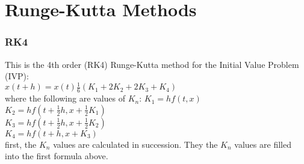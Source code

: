 \section{Runge-Kutta Methods}
\subsubsection*{RK4}
This is the 4th order (RK4) Runge-Kutta
method for the Initial Value Problem (IVP):\\
$x(t+h) = x(t) \frac{1}{6}( K_1  + 2K_2 + 2K_3 + K_4) $\\
where the following are values of $K_n$:
$ K_1 = h f(t,x)    $\\
$ K_2 = h f(t + \frac{1}{2} h , x + \frac{1}{2} K_1)    $\\
$ K_3 = h f(t + \frac{1}{2} h , x + \frac{1}{2} K_2)    $\\
$ K_4 = h f(t + h ,x + K_3)    $\\
first, the $K_n$ values are calculated in succession. They the $K_n$
values are filled into the first formula above.

